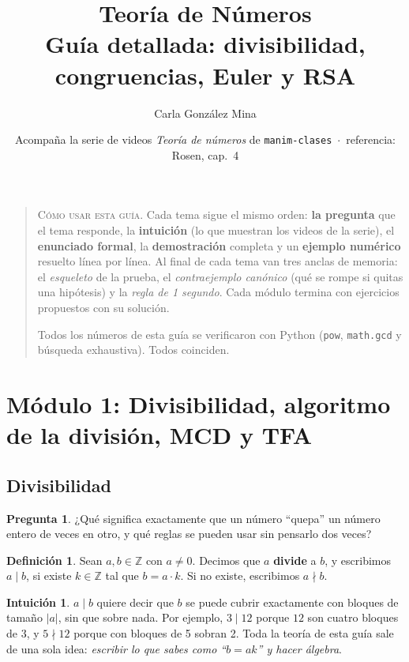 \documentclass[11pt,a4paper]{article}
\title{\textbf{Teoría de Números}\\[2pt]\large Guía detallada: divisibilidad, congruencias, Euler y RSA}
\author{Carla González Mina}
\date{Acompaña la serie de videos \emph{Teoría de números} de \texttt{manim-clases} \,$\cdot$\, referencia: Rosen, cap.~4}
\theoremstyle{definition}
\newtheorem{definicion}[teorema]{Definición}
\newcommand{\Z}{\mathbb{Z}}
\theoremstyle{notait}
\newtheorem*{pregunta}{Pregunta}
\theoremstyle{nota}
\newtheorem*{intuicion}{Intuición}
\begin{document}
\maketitle

\begin{quotation}\small
\noindent\textsc{Cómo usar esta guía.}\enspace
Cada tema sigue el mismo orden: \textbf{la pregunta} que el tema responde, la \textbf{intuición} (lo que muestran los videos de la serie), el \textbf{enunciado formal}, la \textbf{demostración} completa y un \textbf{ejemplo numérico} resuelto línea por línea. Al final de cada tema van tres anclas de memoria: el \emph{esqueleto} de la prueba, el \emph{contraejemplo canónico} (qué se rompe si quitas una hipótesis) y la \emph{regla de 1 segundo}. Cada módulo termina con ejercicios propuestos con su solución.

Todos los números de esta guía se verificaron con Python (\texttt{pow}, \texttt{math.gcd} y búsqueda exhaustiva). Todos coinciden.
\end{quotation}

\tableofcontents
\newpage

\section{Módulo 1: Divisibilidad, algoritmo de la división, MCD y TFA}

\subsection{Divisibilidad}

\begin{pregunta}
¿Qué significa exactamente que un número ``quepa'' un número entero de veces en otro, y qué reglas se pueden usar sin pensarlo dos veces?
\end{pregunta}

\begin{definicion}
Sean $a,b\in\Z$ con $a\neq 0$. Decimos que $a$ \textbf{divide} a $b$, y escribimos $a\mid b$, si existe $k\in\Z$ tal que $b=a\cdot k$. Si no existe, escribimos $a\nmid b$.
\end{definicion}

\begin{intuicion}
$a\mid b$ quiere decir que $b$ se puede cubrir exactamente con bloques de tamaño $|a|$, sin que sobre nada. Por ejemplo, $3\mid 12$ porque $12$ son cuatro bloques de $3$, y $5\nmid 12$ porque con bloques de 5 sobran 2. Toda la teoría de esta guía sale de una sola idea: \emph{escribir lo que sabes como ``$b=ak$'' y hacer álgebra}.
\end{intuicion}
\end{document}
